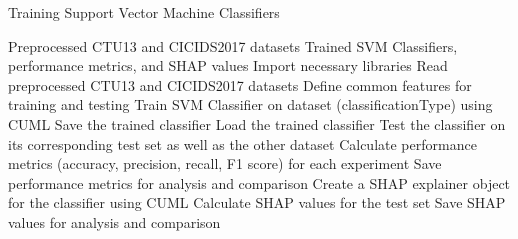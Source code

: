 \begin{algorithm}[ht]
    \caption{Training Support Vector Machine Classifiers}\label{alg:trainSVM}
    \begin{algorithmic}[1]
    \Require%
    Preprocessed CTU13 and CICIDS2017 datasets
    \Ensure%
    Trained SVM Classifiers, performance metrics, and SHAP values
    \State%
    Import necessary libraries
    \State%
    Read preprocessed CTU13 and CICIDS2017 datasets
    \State%
    Define common features for training and testing
        \State%
        Train SVM Classifier on dataset (classificationType) using CUML
        \State%
        Save the trained classifier
    \EndFunction%
        \State%
        Load the trained classifier
        \State%
        Test the classifier on its corresponding test set as well as the other dataset
        \State%
        Calculate performance metrics (accuracy, precision, recall, F1 score) for each experiment
        \State%
        Save performance metrics for analysis and comparison
        \State%
        Create a SHAP explainer object for the classifier using CUML
        \State%
        Calculate SHAP values for the test set
        \State%
        Save SHAP values for analysis and comparison
    \EndFunction%
            \State%
            \State%
            \State%
        \EndIf%
    \EndFor%
        \State%
    \EndFor%
    \end{algorithmic}
\end{algorithm}

